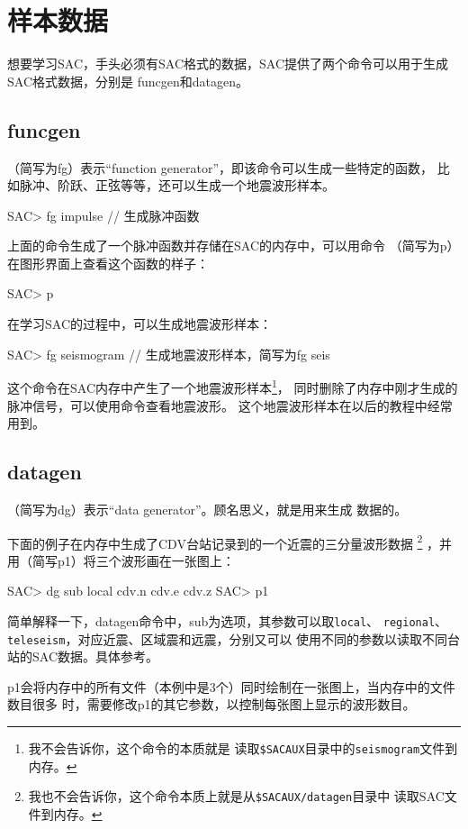 \section{样本数据}

想要学习SAC，手头必须有SAC格式的数据，SAC提供了两个命令可以用于生成SAC格式数据，分别是
funcgen和datagen。

\subsection{funcgen}
（简写为fg）表示``function generator''，即该命令可以生成一些特定的函数，
比如脉冲、阶跃、正弦等等，还可以生成一个地震波形样本。
\begin{SACCode}
SAC> fg impulse         // 生成脉冲函数
\end{SACCode}
上面的命令生成了一个脉冲函数并存储在SAC的内存中，可以用命令
（简写为p）在图形界面上查看这个函数的样子：
\begin{SACCode}
SAC> p
\end{SACCode}
在学习SAC的过程中，可以生成地震波形样本：
\begin{SACCode}
SAC> fg seismogram      // 生成地震波形样本，简写为fg seis
\end{SACCode}
这个命令在SAC内存中产生了一个地震波形样本\footnote{我不会告诉你，这个命令的本质就是
读取\lstinline{$SACAUX}目录中的\lstinline{seismogram}文件到内存。}，
同时删除了内存中刚才生成的脉冲信号，可以使用命令查看地震波形。
这个地震波形样本在以后的教程中经常用到。

\subsection{datagen}
（简写为dg）表示``data generator''。顾名思义，就是用来生成
数据的。

下面的例子在内存中生成了CDV台站记录到的一个近震的三分量波形数据
\footnote{我也不会告诉你，这个命令本质上就是从\lstinline{$SACAUX/datagen}目录中
读取SAC文件到内存。}
，并用（简写p1）将三个波形画在一张图上：
\begin{SACCode}
SAC> dg sub local cdv.n cdv.e cdv.z
SAC> p1 
\end{SACCode}
简单解释一下，datagen命令中，sub为选项，其参数可以取\lstinline{local}、
\lstinline{regional}、\lstinline{teleseism}，对应近震、区域震和远震，分别又可以
使用不同的参数以读取不同台站的SAC数据。具体参考。

p1会将内存中的所有文件（本例中是3个）同时绘制在一张图上，当内存中的文件数目很多
时，需要修改p1的其它参数，以控制每张图上显示的波形数目。
